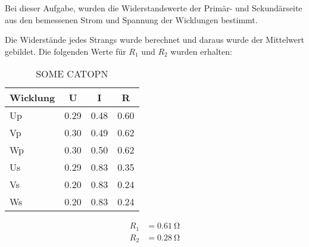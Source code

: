 Bei dieser Aufgabe, wurden die Widerstandswerte der Primär- und Sekundärseite aus den bemessenen Strom und Spannung der Wicklungen bestimmt. \par

Die Widerstände jedes Strangs wurde berechnet und daraus wurde der Mittelwert gebildet. 
Die folgenden Werte für $R_1$ und $R_2$ wurden erhalten:
\begin{table}[H]
\centering
\begin{tabular}{@{}llll@{}}
\toprule
\multicolumn{1}{c}{Wicklung} & \multicolumn{1}{c}{U} & \multicolumn{1}{c}{I} & \multicolumn{1}{c}{R} \\ \midrule
Up                           & 0.29                  & 0.48                  & 0.60                  \\
Vp                           & 0.30                  & 0.49                  & 0.62                  \\
Wp                           & 0.30                  & 0.50                  & 0.62                  \\
Us                           & 0.29                  & 0.83                  & 0.35                  \\
Vs                           & 0.20                  & 0.83                  & 0.24                  \\
Ws                           & 0.20                  & 0.83                  & 0.24                  \\ \bottomrule
\end{tabular}%
\caption{SOME CATOPN}
\label{tab:my-table}
\end{table}
\begin{align*}
    R_1 &= \SI{0.61}{\ohm} \\ R_2 &= \SI{0.28}{\ohm}
\end{align*}

